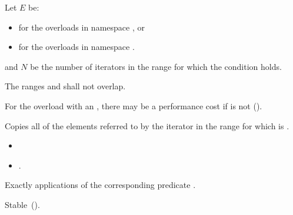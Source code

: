 \begin{itemdescr}
\pnum
{\color{newclr}
Let $E$ be:
\begin{itemize}
\item {} for the overloads in namespace , or
\item {} for the overloads in namespace .
\end{itemize}
} %
\begin{addedblock}
and $N$ be the number of iterators  in the range 
for which the condition   holds.
\end{addedblock}

\pnum
\requires The ranges  and  shall not overlap.
\begin{note}
For the overload with an , there may be a performance
cost if  is not
 ().
\end{note}

\pnum
\effects Copies all of the elements referred to by the iterator  in the range 
for which   is .

\pnum
\returns {}
\begin{itemize}
\item {}
\item {}
  .
\end{itemize}

\pnum
\complexity Exactly  applications of the corresponding predicate
.

\pnum
\remarks Stable~().
\end{itemdescr}

